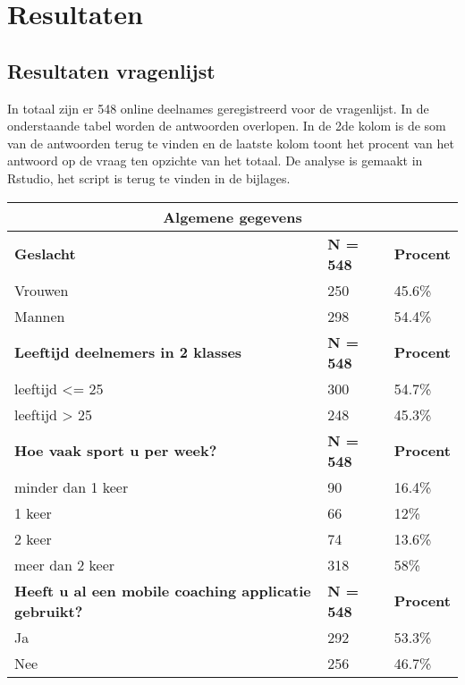 \chapter{Resultaten}
\label{ch:resultaten}

\section{Resultaten vragenlijst}
\label{sec:Resultaten vragenlijst}
In totaal zijn er 548 online deelnames geregistreerd voor de vragenlijst. In de onderstaande tabel worden de antwoorden overlopen. In de 2de kolom is de som van de antwoorden terug te vinden en de laatste kolom toont het procent van het antwoord op de vraag ten opzichte van het totaal. De analyse is gemaakt in Rstudio, het script is terug te vinden in de bijlages.
\begin{table}[h!]
\begin{center}
\begin{tabular}{ |p{10cm}|p{2cm}|p{2cm}| }
 \hline
 \multicolumn{3}{|c|}{Algemene gegevens} \\
 \hline
 \textbf{Geslacht} & \textbf{N = 548} &\textbf{Procent}\\ 
 \hline
 Vrouwen   & 250    &45.6\%   \\
 Mannen &   298  &54.4\%   \\
 \hline
 \textbf{Leeftijd deelnemers in 2 klasses} & \textbf{N = 548} &\textbf{Procent}\\ 
 \hline
 leeftijd <= 25   & 300    &54.7\%   \\
 leeftijd > 25 &   248  &45.3\%   \\
 \hline
  \textbf{Hoe vaak sport u per week? } & \textbf{N = 548} &\textbf{Procent}\\ 
 \hline
 minder dan 1 keer   & 90    &16.4\%   \\
 1 keer &   66  &12\%   \\
 2 keer &   74  &13.6\%   \\
meer dan 2 keer &   318 &58\%   \\
 \hline
     \textbf{Heeft u al een mobile coaching applicatie gebruikt?} & \textbf{N = 548} &\textbf{Procent}\\ 
 \hline
Ja   & 292    &53.3\%   \\
Nee &   256  &46.7\%   \\
  \hline
\end{tabular}
\end{center}
\end{table}

